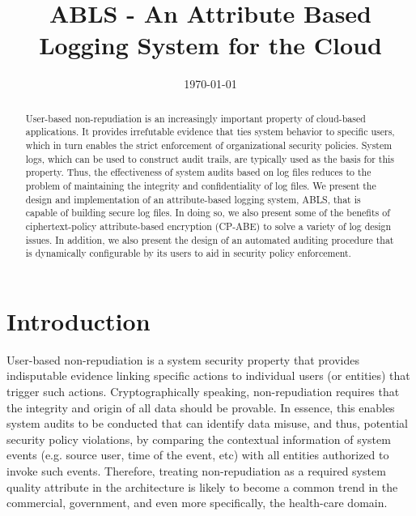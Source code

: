 \documentclass{sig-alternate}
\begin{document}
\title{ABLS - An Attribute Based Logging System for the Cloud}
\author{
}
\date{\today}
\maketitle
\begin{abstract}
User-based non-repudiation is an increasingly important property of cloud-based applications. It provides irrefutable evidence that ties system behavior to specific users, which in turn enables the strict enforcement of organizational security policies. System logs, which can be used to construct audit trails, are typically used as the basis for this property. Thus, the effectiveness of system audits based on log files reduces to the problem of maintaining the integrity and confidentiality of log files. We present the design and implementation of an attribute-based logging system, ABLS, that is capable of building secure log files. In doing so, we also present some of the benefits of ciphertext-policy attribute-based encryption (CP-ABE) to solve a variety of log design issues. In addition, we also present the design of an automated auditing procedure
that is dynamically configurable by its users to aid in security policy enforcement.
\end{abstract}

\section{Introduction}
User-based non-repudiation is a system security property that provides indisputable evidence linking
specific actions to individual users (or entities) that trigger such actions. Cryptographically speaking, 
non-repudiation requires that the integrity and 
origin of all data should be provable. In essence, this enables system audits to be conducted that can
identify data misuse, and thus, potential security policy violations, by comparing the contextual information 
of system events (e.g. source user, time of the event, etc) with all entities authorized to invoke such events. 
Therefore, treating non-repudiation as a required system quality attribute in the architecture is likely to 
become a common trend in the commercial, government, and even more specifically, the health-care domain.
\end{document}
